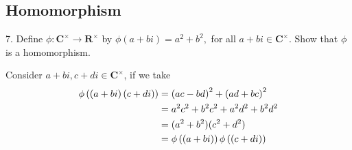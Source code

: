 \subsection{Homomorphism}
\begin{mdframed}[style=darkQuesion]
  7. Define $\phi: \mathbf{C}^{\times} \rightarrow \mathbf{R}^{\times}$ by $\phi(a+b i)=a^{2}+b^{2},$ for all $a+b i \in \mathbf{C}^{\times} .$ Show that $\phi$
is a homomorphism.
\end{mdframed}
\begin{mdframed}[style=darkAnswer,frametitle={Joe Starr}]
Consider $a+bi, c+di\in \mathbf{C}^{\times}$, if we take 
\begin{align*}
  \phi\left(\left(a+bi\right) \left(c+di\right)\right)&=\left(a c- b d\right)^2 +  \left(a d +  b c\right)^2\\
  &=a^2 c^2 + b^2 c^2 + a^2 d^2 + b^2 d^2\\
  &=(a^2 + b^2) (c^2 + d^2)\\
  &=\phi\left(\left(a+bi\right)\right) \phi\left(\left(c+di\right)\right)
\end{align*}
\end{mdframed}
\newpage
